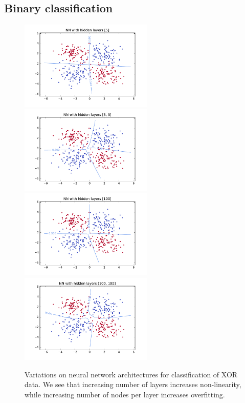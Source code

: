 \documentclass{article}
\begin{document}
\begin{multicols}{2}
\subsection{Binary classification}
\label{subsec:binary}

\begin{figure}
   \centering
   \includegraphics[width=2.5in]{img/p1/4-1small-382of400-16500.pdf}
   \includegraphics[width=2.5in]{img/p1/4-2small-380of400-3550.pdf}
   \includegraphics[width=2.5in]{img/p1/4-1large-380of400.pdf}
   \includegraphics[width=2.5in]{img/p1/4-2large-379of400-123000.pdf}
   \caption{Variations on neural network architectures for classification of
   XOR data. We see that increasing number of layers increases non-linearity,
   while increasing number of nodes per layer increases overfitting. 
   }
   \label{fig:1-2-arch}
\end{figure}


\end{multicols}
\end{document}
